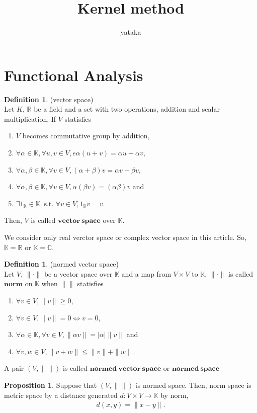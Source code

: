\documentclass[11pt, a4paper, dvipdfmx]{jsarticle}
\title{Kernel method}
\author{yataka}
\date{}
\theoremstyle{definition}
\newtheorem{Definition+}[Axiom+]{Definition}
\newtheorem{Proposition+}[Axiom+]{Proposition}
\newcommand{\R}{\mathbb{R}}
\newcommand{\C}{\mathbb{C}}
\newcommand{\K}{\mathbb{K}}
\begin{document}
\maketitle
\section{Functional Analysis}
\begin{Definition+}(vector space)\\
    Let $K$, $\R$ be a field and a set with two operations, addition and scalar multiplication.
    If $V$ statisfies
    \begin{enumerate}
        \item $V$ becomes commutative group by addition,
        \item $\forall\alpha\in\K, \forall u, v\in V, e\alpha(u + v) = \alpha u + \alpha v$,
        \item $\forall \alpha, \beta\in\K, \forall v\in V, (\alpha + \beta)v = \alpha v + \beta v$,
        \item $\forall \alpha, \beta\in\K, \forall v\in V, \alpha(\beta v) = (\alpha\beta)v$ and 
        \item $\exists 1_{\K}\in\K~\text{ s.t. }\forall v\in V, 1_{\K}v = v$.
    \end{enumerate}
    Then, $V$ is called $\mathbf{vector~space}$ over $\K$.
\end{Definition+}
We consider only real verctor space or complex vector space in this article. So, 
$\K = \R$ or $\K = \C$.
\begin{Definition+}(normed vector space)\\
    Let $V$, $\|\cdot\|$ be a vector space over $\K$ and a map from $V\times V$ to $\K$.
    $\|\cdot\|$ is called $\mathbf{norm}$ on $\K$ when $\|\|$ statisfies 
    \begin{enumerate}
        \item $\forall v\in V, \|v\| \geq 0$,
        \item $\forall v\in V, \|v\| = 0 \iff v = 0$,
        \item $\forall \alpha\in\K, \forall v\in V, \|\alpha v\| = |\alpha|\|v\|$ and 
        \item $\forall v, w\in V, \|v + w\|\leq \|v\| + \|w\|$.
    \end{enumerate}
    A pair $(V, \|\|)$ is called $\mathbf{normed~vector~space}$ or $\mathbf{normed~space}$
\end{Definition+}
\begin{Proposition+}
    Suppose that $(V, \|\|)$ is normed space.
    Then, norm space is metric space by a distance generated $d:V\times V\to\K$ by norm,
    \begin{align*}
        d(x, y) = \|x - y\|.
    \end{align*}
\end{Proposition+}
\end{document}
